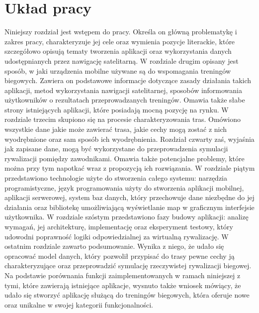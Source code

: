 \section{Układ pracy}
Niniejszy rozdział jest wstępem do pracy. Określa on główną problematykę i zakres pracy, charakteryzuje jej cele oraz wymienia pozycje literackie, które szczegółowo opisują tematy tworzenia aplikacji oraz wykorzystania danych udostępnianych przez nawigację satelitarną. W rozdziale drugim opisany jest sposób, w jaki urządzenia mobilne używane są do wspomagania treningów biegowych. Zawiera on podstawowe informacje dotyczące zasady działania takich aplikacji, metod wykorzystania nawigacji satelitarnej, sposobów informowania użytkowników o rezultatach przeprowadzanych treningów. Omawia także słabe strony istniejących aplikacji, które posiadają mocną pozycję na rynku. W rozdziale trzecim skupiono się na procesie charakteryzowania tras. Omówiono wszystkie dane jakie może zawierać trasa, jakie cechy mogą zostać z nich wyodrębnione oraz sam sposób ich wyodrębnienia. Rozdział czwarty zaś, wyjaśnia jak zapisane dane, mogą być wykorzystane do przeprowadzenia symulacji rywalizacji pomiędzy zawodnikami. Omawia także potencjalne problemy, które można przy tym napotkać wraz z propozycją ich rozwiązania. W rozdziale piątym przedstawiono technologie użyte do stworzenia całego systemu: narzędzia programistyczne, język programowania użyty do stworzenia aplikacji mobilnej, aplikacji serwerowej, system baz danych, który przechowuje dane niezbędne do jej działania oraz bibliotekę umożliwiającą wyświetlanie map w graficznym interfejsie użytkownika. W rozdziale szóstym przedstawiono fazy budowy aplikacji: analizę wymagań, jej architekturę, implementację oraz eksperyment testowy, który udowodni poprawność logiki odpowiedzialnej za wirtualną rywalizację. W ostatnim rozdziale zawarto podsumowanie. Wynika z niego, że udało się opracować model danych, który pozwolił przypisać do trasy pewne cechy ją charakteryzujące oraz przeprowadzić symulację rzeczywistej rywalizacji biegowej. Na podstawie porównania funkcji zaimplementowanych w ramach niniejszej z tymi, które zawierają istniejące aplikacje, wysnuto także wniosek mówiący, że udało się stworzyć aplikację służącą do treningów biegowych, która oferuje nowe oraz unikalne w swojej kategorii funkcjonalności.